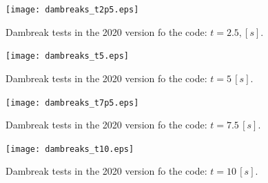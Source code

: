 \documentclass[11pt, a4paper, oneside, openany]{book}
\begin{document}
\begin{figure}[!ht]
	\centering
	\texttt{[image: dambreaks\_t2p5.eps]}
	\caption[Dambreak 2020 Code t=2.5s]{Dambreak tests in the 2020 version fo the code: $t=2.5,[s]$.}\label{Dambreak4Tests_5}
\end{figure}
\begin{figure}[!ht]
	\centering
	\texttt{[image: dambreaks\_t5.eps]}
	\caption[Dambreak 2020 Code t=5s]{Dambreak tests in the 2020 version fo the code: $t=5\,[s]$.}\label{Dambreak4Tests_6}
\end{figure}
\begin{figure}[!ht]
	\centering
	\texttt{[image: dambreaks\_t7p5.eps]}
	\caption[Dambreak 2020 Code t=7.5s]{Dambreak tests in the 2020 version fo the code: $t=7.5\,[s]$.}\label{Dambreak4Tests_7}
\end{figure}
\begin{figure}[!ht]
	\centering
	\texttt{[image: dambreaks\_t10.eps]}
	\caption[Dambreak 2020 Code t=10s]{Dambreak tests in the 2020 version fo the code: $t=10\,[s]$.}\label{Dambreak4Tests_8}
\end{figure}

\end{document}
